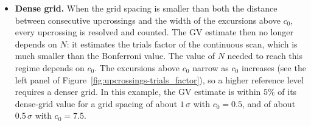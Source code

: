 \begin{itemize}
    \item {\bf Dense grid.} When the grid spacing is smaller than both the distance between consecutive upcrossings and the width of the excursions above $c_0$, every upcrossing is resolved and counted. The GV estimate then no longer depends on $N$: it estimates the trials factor of the continuous scan, which is much smaller than the Bonferroni value. The value of $N$ needed to reach this regime depends on $c_0$. The excursions above $c_0$ narrow as $c_0$ increases (see the left panel of Figure~\ref{fig:upcrossings-trials_factor}), so a higher reference level requires a denser grid. In this example, the GV estimate is within $5\%$ of its dense-grid value for a grid spacing of about $1\,\sigma$ with $c_0=0.5$, and of about $0.5\,\sigma$ with $c_0=7.5$.
\end{itemize}

